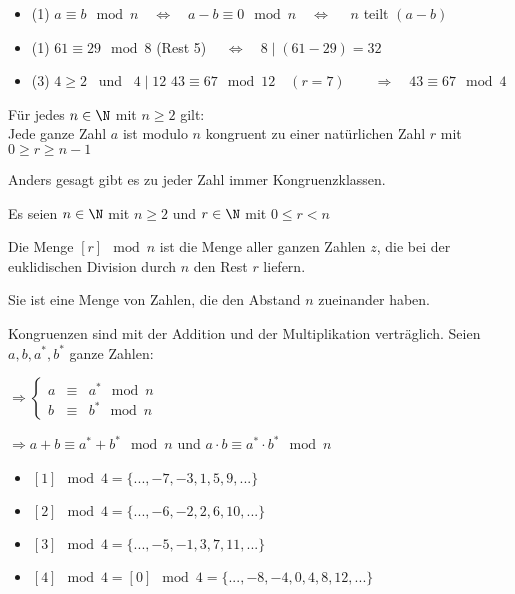 \documentclass[main.tex]{subfiles}
\begin{document}
\begin{Beweis}
	\begin{itemize}
		\item (1) \quad $ a \equiv b \mod n \quad\Leftrightarrow\quad a - b \equiv 0 \mod n \quad\Leftrightarrow\quad $ $n$ teilt $(a-b)$
	\end{itemize}
\end{Beweis}

\begin{Beispiel}
	\begin{itemize}
		\item (1) \quad $61 \equiv 29 \mod 8$ \quad (Rest 5) $\quad\Leftrightarrow\quad 8\mid  (61-29) = 32 $
		\item (3) \quad $4 \geq 2$ \, und \, $4\mid 12$ \quad $43 \equiv 67 \mod 12 \quad(r=7)\qquad \Rightarrow \quad 43 \equiv 67 \mod 4  $
	\end{itemize}
\end{Beispiel}

\begin{Theorem}
	Für jedes $n\in \N$ mit $n\geq 2$ gilt: \\Jede ganze Zahl $a$ ist modulo $n$ kongruent zu einer natürlichen Zahl $r$ mit $0 \geq r \geq n-1$
	
	Anders gesagt gibt es zu jeder Zahl immer Kongruenzklassen.
\end{Theorem}

\begin{Definition}
	Es seien $n \in \N$ mit $n \geq 2$ und $r \in \N$ mit $0 \leq r < n$

	Die Menge $ [r] \mod n $ ist die Menge aller ganzen Zahlen $z$, die bei der euklidischen Division durch $n$ den Rest $r$ liefern.
	
	Sie ist eine Menge von Zahlen, die den Abstand $n$ zueinander haben.
	
	Kongruenzen sind mit der Addition und der Multiplikation verträglich. Seien $a, b, a^{*}, b^{*}$ ganze Zahlen:
	
	$\Rightarrow \left \{ \begin{array}{rcl}
		a & \equiv & a^{*} \mod n  \\
		b & \equiv & b^{*}\mod n
	\end{array} \right .$

	$\Rightarrow a+b \equiv a^{*} + b^{*} \mod n$ \qquad und \qquad  $a\cdot b \equiv a^{*} \cdot b^{*} \mod n$
\end{Definition}

\begin{Beispiel}
	\begin{itemize}
		\item $ [1] \mod 4 = \{ ... , -7, -3, 1, 5, 9, ... \} $
		\item $ [2] \mod 4 = \{ ... , -6, -2, 2, 6, 10, ... \} $
		\item $ [3] \mod 4 = \{ ... , -5, -1, 3, 7, 11, ... \} $
		\item $ [4] \mod 4 = [0] \mod 4 = \{ ... , -8, -4, 0, 4, 8, 12, ... \} $
	\end{itemize}
\end{Beispiel}
\end{document}
